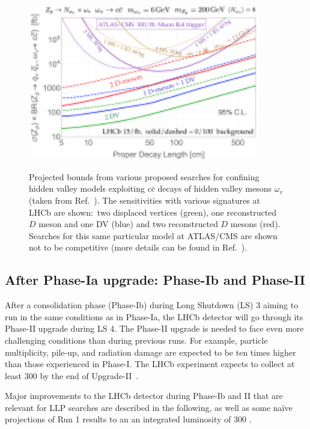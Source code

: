\begin{figure}[t]
  \centering
  {\includegraphics[width=0.9\textwidth]{figures/lhcb_hvlimits2.pdf}}
  \caption{Projected bounds from various proposed searches for confining hidden valley models exploiting $c\bar{c}$ decays of hidden valley mesons $\omega_v$ (taken from Ref.~\cite{Pierce:2017taw}). The sensitivities with various signatures at LHCb are shown:~two displaced vertices (green), one reconstructed $D$ meson and one DV (blue) and two reconstructed $D$ mesons (red). Searches for this same particular model at ATLAS/CMS are shown not to be competitive (more details can be found in Ref.~\cite{Pierce:2017taw}).}
  \label{fig:HVlim}
\end{figure}

\subsection{After Phase-Ia upgrade: Phase-Ib and Phase-II}
\label{sec:ulhcbphaseii}

After a consolidation phase (Phase-Ib) during Long Shutdown (LS) 3 aiming to run in the same conditions as in Phase-Ia, the LHCb detector will go through its Phase-II upgrade during LS 4. The Phase-II upgrade is needed to face even more challenging conditions than during previous runs. For example, particle multiplicity, pile-up, and radiation damage are expected to be ten times higher than those experienced in Phase-I. The LHCb experiment expects to collect at least 300 \invfb by the end of Upgrade-II~\cite{LHCbUpgradeIIPC}.

Major improvements to the LHCb detector during Phase-Ib and II that are relevant for LLP searches are described in the following, as well as some na\"ive projections of Run 1 results to an an integrated luminosity of 300 \invfb.


